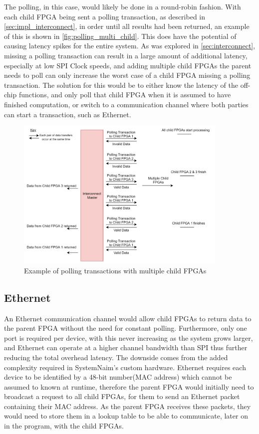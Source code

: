 The polling, in this case, would likely be done in a round-robin fashion. With each child FPGA being sent a polling transaction, as described in \autoref{sec:impl_interconnect}, in order until all results had been returned, an example of this is shown in  \autoref{fig:polling_multi_child}. This does have the potential of causing latency spikes for the entire system. As was explored in \autoref{sec:interconnect}, missing a polling transaction can result in a large amount of additional latency, especially at low SPI Clock speeds, and adding multiple child FPGAs the parent needs to poll can only increase the worst case of a child FPGA missing a polling transaction. The solution for this would be to either know the latency of the off-chip functions, and only poll that child FPGA when it is assumed to have finished computation, or switch to a communication channel where both parties can start a transaction, such as Ethernet.

\begin{figure}[!htb]
    \centering
    \includegraphics[width=0.9\textwidth]{06_future_work/images/interconnect_polling_multi_child.png}
    \caption{Example of polling transactions with multiple child FPGAs}
    \label{fig:polling_multi_child}
\end{figure}

\subsection{Ethernet}

An Ethernet communication channel would allow child FPGAs to return data to the parent FPGA without the need for constant polling. Furthermore, only one port is required per device, with this never increasing as the system grows larger, and Ethernet can operate at a higher channel bandwidth than SPI thus further reducing the total overhead latency. The downside comes from the added complexity required in SystemNaim's custom hardware. Ethernet requires each device to be identified by a 48-bit number(MAC address) which cannot be assumed to known at runtime, therefore the parent FPGA would initially need to broadcast a request to all child FPGAs, for them to send an Ethernet packet containing their MAC address. As the parent FPGA receives these packets, they would need to store them in a lookup table to be able to communicate, later on in the program, with the child FPGAs.

